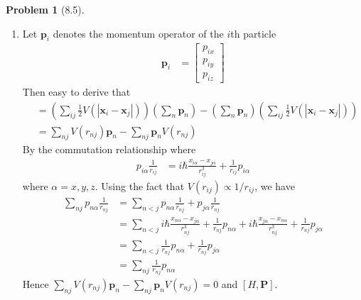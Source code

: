\documentclass[twoside,11pt]{article}
\theoremstyle{definition}
\newtheorem{problem}{Problem}
\theoremstyle{remark}
\begin{document}
\begin{problem}[8.5]\
\begin{enumerate}[label=(\alph*)]
\item Let $\mathbf{p}_i$ denotes the momentum operator of the $i$th particle
\begin{align*}
    \mathbf{p}_i &= \begin{bmatrix}
        p_{ix}\\ p_{iy}\\ p_{iz}
    \end{bmatrix}
\end{align*}
Then easy to derive that
\begin{align*}
    [H, \mathbf{P}] &= 
    \left(\sum_{ij}\frac{1}{2}V(|\mathbf{x}_i-\mathbf{x}_j|)\right)
    \left(\sum_n \mathbf{p}_n\right) - 
    \left(\sum_n \mathbf{p}_n\right)
    \left(\sum_{ij}\frac{1}{2}V(|\mathbf{x}_i-\mathbf{x}_j|)\right)\\
    &=
    \sum_{nj}
    V(r_{nj})
    \mathbf{p}_n
    -
    \sum_{nj}
    \mathbf{p}_n
    V(r_{nj})
\end{align*}
By the commutation relationship where
\begin{align*}
    p_{i\alpha}\frac{1}{r_{ij}} &= i\hbar\frac{x_{i\alpha} - x_{j\alpha}}{r_{ij}^3}
    + \frac{1}{r_{ij}}p_{i\alpha}
\end{align*}
where $\alpha=x, y, z$.
Using the fact that $V(r_{ij})\propto 1/r_{ij}$,
we have
\begin{align*}
    \sum_{nj}p_{n\alpha}\frac{1}{r_{nj}} &= 
    \sum_{n<j} p_{n\alpha}\frac{1}{r_{nj}} + p_{j\alpha} \frac{1}{r_{nj}}\\
    &= \sum_{n<j}
    i\hbar\frac{x_{n\alpha} - x_{j\alpha}}{r_{nj}^3} + \frac{1}{r_{nj}}p_{n\alpha}
    +
    i\hbar\frac{x_{j\alpha} - x_{n\alpha}}{r_{nj}^3} + \frac{1}{r_{nj}}p_{j\alpha}\\
    &= 
    \sum_{n<j}
    \frac{1}{r_{nj}}p_{n\alpha} + \frac{1}{r_{nj}}p_{j\alpha}\\
    &= \sum_{nj} \frac{1}{r_{nj}}p_{n\alpha}
\end{align*}
Hence $\sum_{nj}
V(r_{nj})
\mathbf{p}_n
-
\sum_{nj}
\mathbf{p}_n
V(r_{nj})=0$ and $[H,\mathbf{P}]$.


\end{enumerate}
\end{problem}
\end{document}
